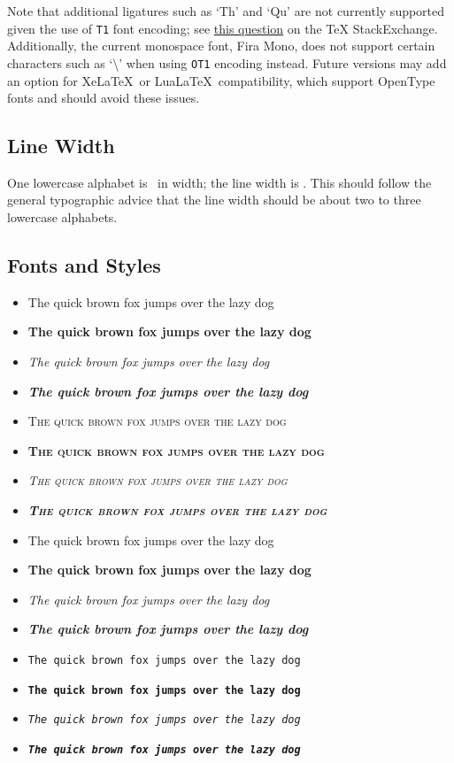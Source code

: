 \documentclass{l3doc}
\begin{document}
Note that additional ligatures such as `Th' and `Qu' are not currently supported given the use of \texttt{T1} font encoding; see \href{https://tex.stackexchange.com/q/373440}{this question} on the TeX StackExchange. Additionally, the current monospace font, Fira Mono, does not support certain characters such as `\textbackslash' when using \texttt{OT1} encoding instead. Future versions may add an option for Xe\LaTeX\ or Lua\LaTeX\ compatibility, which support OpenType fonts and should avoid these issues.

\subsection{Line Width}

\newlength{\alphabetwidth}
\settowidth{\alphabetwidth}{abcdefghijklmnopqrstuvwxyz}

One lowercase alphabet is \the\alphabetwidth\ in width; the line width is \the\linewidth. This should follow the general typographic advice that the line width should be about two to three lowercase alphabets.

\subsection{Fonts and Styles}

\begin{itemize}
  \item The quick brown fox jumps over the lazy dog
  \item \textbf{The quick brown fox jumps over the lazy dog}
  \item \emph{The quick brown fox jumps over the lazy dog}
  \item \textbf{\emph{The quick brown fox jumps over the lazy dog}}
  \item \textsc{The quick brown fox jumps over the lazy dog}
  \item \textsc{\textbf{The quick brown fox jumps over the lazy dog}}
  \item \textsc{\emph{The quick brown fox jumps over the lazy dog}}
  \item \textsc{\emph{\textbf{The quick brown fox jumps over the lazy dog}}}
  \item \textsf{The quick brown fox jumps over the lazy dog}
  \item \textsf{\textbf{The quick brown fox jumps over the lazy dog}}
  \item \textsf{\emph{The quick brown fox jumps over the lazy dog}}
  \item \textsf{\emph{\textbf{The quick brown fox jumps over the lazy dog}}}
  \item \texttt{The quick brown fox jumps over the lazy dog}
  \item \texttt{\textbf{The quick brown fox jumps over the lazy dog}}
  \item \texttt{\emph{The quick brown fox jumps over the lazy dog}}
  \item \texttt{\textbf{\emph{The quick brown fox jumps over the lazy dog}}}
\end{itemize}
\end{document}
